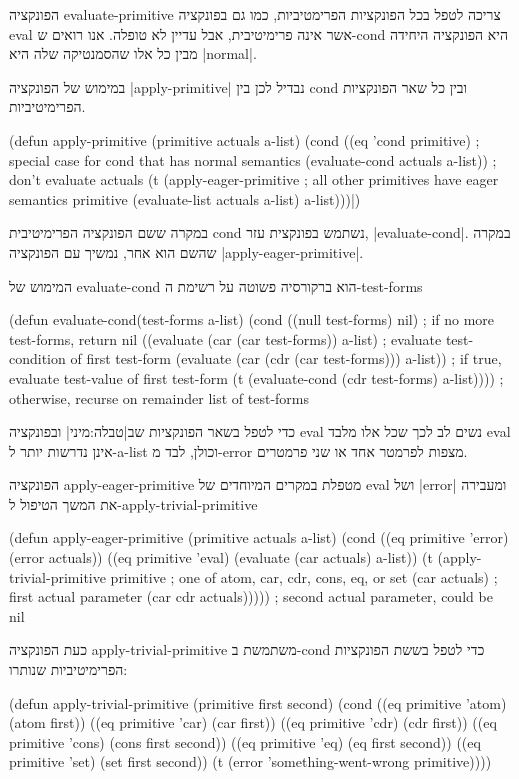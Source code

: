 הפונקציה
evaluate-primitive צריכה לטפל בכל הפונקציות הפרימטיביות, כמו גם בפונקציה eval
אשר אינה פרימיטיבית, אבל עדיין לא טופלה. אנו רואים ש-cond היא הפונקציה היחידה
מבין כל אלו שהסמנטיקה
שלה היא \E|normal|.

\minipage\textwidth
במימוש של הפונקציה \E|apply-primitive| נבדיל לכן בין cond ובין כל שאר הפונקציות
הפרימיטיביות.
\begin{KERNEL}
(defun apply-primitive (primitive actuals a-list)
  (cond ((eq 'cond primitive) ; special case for cond that has normal semantics
            (evaluate-cond actuals a-list)) ; don't evaluate actuals
        (t (apply-eager-primitive ; all other primitives have eager semantics
              primitive
              (evaluate-list actuals a-list)
              a-list)))|)
\end{KERNEL}
\endminipage

במקרה ששם הפונקציה הפרימיטיבית cond נשתמש בפונקצית עזר, \E|evaluate-cond|. במקרה
שהשם הוא אחר, נמשיך עם הפונקציה \E|apply-eager-primitive|.

המימוש של evaluate-cond הוא ברקורסיה פשוטה על רשימת ה-test-forms
\begin{KERNEL}
(defun evaluate-cond(test-forms a-list)
  (cond ((null test-forms) nil) ; if no more test-forms, return nil
        ((evaluate (car (car test-forms)) a-list) ; evaluate test-condition of first test-form
        (evaluate (car (cdr (car test-forms))) a-list)) ; if true, evaluate test-value of first test-form
        (t (evaluate-cond (cdr test-forms) a-list)))) ; otherwise, recurse on remainder list of test-forms
\end{KERNEL}

כדי לטפל בשאר הפונקציות שב|טבלה:מיני| ובפונקציה eval נשים לב לכך שכל אלו
מלבד eval אינן נדרשות יותר ל-a-list וכולן, לבד מ-error מצפות לפרמטר אחד או שני פרמטרים.

הפונקציה apply-eager-primitive מטפלת במקרים המיוחדים של eval ושל \E|error|
ומעבירה את המשך הטיפול ל-apply-trivial-primitive
\begin{KERNEL}
(defun apply-eager-primitive (primitive actuals a-list)
  (cond ((eq primitive 'error) (error actuals))
        ((eq primitive 'eval) (evaluate (car actuals) a-list))
        (t (apply-trivial-primitive
              primitive ; one of atom, car, cdr, cons, eq, or set
              (car actuals) ; first actual parameter
              (car cdr actuals))))) ; second actual parameter, could be nil
\end{KERNEL}

כעת הפונקציה apply-trivial-primitive משתמשת ב-cond כדי לטפל בששת הפונקציות הפרימיטיביות שנותרו:
\begin{KERNEL}
(defun apply-trivial-primitive (primitive first second)
  (cond ((eq primitive 'atom) (atom first))
        ((eq primitive 'car) (car first))
        ((eq primitive 'cdr) (cdr first))
        ((eq primitive 'cons) (cons first second))
        ((eq primitive 'eq) (eq first second))
        ((eq primitive 'set) (set first second))
        (t (error 'something-went-wrong primitive))))
\end{KERNEL}

